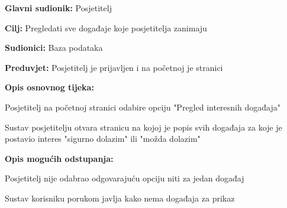 					\noindent {}
\begin{packed_item}
	\item \textbf{Glavni sudionik:} Posjetitelj
	\item  \textbf{Cilj:} Pregledati sve događaje koje posjetitelja zanimaju
	\item  \textbf{Sudionici:} Baza podataka
	\item  \textbf{Preduvjet:} Posjetitelj je prijavljen i na početnoj je stranici
	\item  \textbf{Opis osnovnog tijeka:}
	
	\item[] \begin{packed_enum}
		
		\item Posjetitelj na početnoj stranici odabire opciju "Pregled interesnih događaja"
		\item Sustav posjetitelju otvara stranicu na kojoj je popis svih događaja za koje je postavio interes "sigurno dolazim" ili "možda dolazim"
	\end{packed_enum}
	
	\item  \textbf{Opis mogućih odstupanja:}
	
	\item[] \begin{packed_item}
		
		\item[2.a] Posjetitelj nije odabrao odgovarajuću opciju niti za jedan događaj
		\item[] \begin{packed_enum}
			
			\item Sustav korisniku porukom javlja kako nema događaja za prikaz
			
		\end{packed_enum}
	\end{packed_item}
\end{packed_item}

